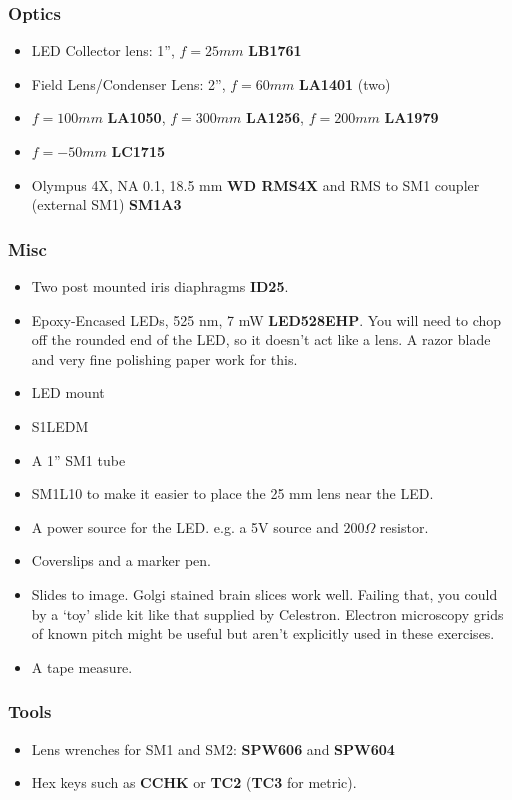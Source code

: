 \documentclass[a4paper]{report}
\begin{document}
\subsubsection{Optics}
\begin{itemize}
\item LED Collector lens: 1'', $f=25 mm$ \textbf{LB1761}
\item Field Lens/Condenser Lens: 2'', $f=60 mm$ \textbf{LA1401} (two)
\item $f=100 mm$ \textbf{LA1050}, $f=300 mm$ \textbf{LA1256}, $f=200 mm$ \textbf{LA1979}
\item $f=-50 mm$ \textbf{LC1715}
\item Olympus 4X, NA 0.1, 18.5 mm \textbf{WD RMS4X} and RMS to SM1 coupler (external SM1) \textbf{SM1A3}
\end{itemize}

\subsubsection{Misc}
\begin{itemize}
\item Two post mounted iris diaphragms \textbf{ID25}. 
\item Epoxy-Encased LEDs, 525 nm, 7 mW \textbf{LED528EHP}. 
You will need to chop off the rounded end of the LED, so it doesn't act like a lens.  
A razor blade and very fine polishing paper work for this.
\item LED mount \item{S1LEDM}
\item A 1'' SM1 tube \item{SM1L10} to make it easier to place the 25 mm lens near the LED.
\item A power source for the LED. e.g. a 5V source and $200\Omega$ resistor. 
\item Coverslips and a marker pen.
\item Slides to image. Golgi stained brain slices work well. 
Failing that, you could by a `toy' slide kit like that supplied by Celestron. 
Electron microscopy grids of known pitch might be useful but aren't explicitly used in these exercises.
\item A tape measure. 
\end{itemize}

\subsubsection{Tools}
\begin{itemize}
\item Lens wrenches for SM1 and SM2: \textbf{SPW606} and \textbf{SPW604}
\item Hex keys such as \textbf{CCHK} or \textbf{TC2} (\textbf{TC3} for metric). 
\end{itemize}
\end{document}
